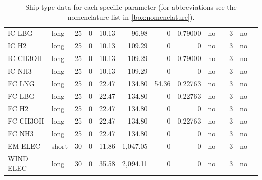 \documentclass[article]{elsarticle}
\begin{document}
\begin{table}[htb]
{\begin{tabular}{llrrrrrrrrrrr}
        IC LBG         & long  & 25     & 0      & 10.13       & 96.98    & 0                & 0.79000          & no    &                & 3           & no     & \cite{UNCTAD2017,Bengtsson2012} \\
        IC H2          & long  & 25     & 0      & 10.13       & 109.29   & 0                & 0                & no    &                & 3           & no     & \cite{UNCTAD2017,ElGohary2013} \\
        IC CH3OH       & long  & 25     & 0      & 10.13       & 109.29   & 0                & 0.79000          & no    &                & 3           & no     & \cite{UNCTAD2017,Andersson2015,BRYNOLF2014} \\
        IC NH3         & long  & 25     & 0      & 10.13       & 109.29   & 0                & 0                & no    &                & 3           & no     & \cite{UNCTAD2017} \\
        FC LNG         & long  & 25     & 0      & 22.47       & 134.80   & 54.36            & 0.22763          & no    &                & 3           & no     & \cite{UNCTAD2017,VanBiert2016} \\
        FC LBG         & long  & 25     & 0      & 22.47       & 134.80   & 0                & 0.22763          & no    &                & 3           & no     & \cite{UNCTAD2017,VanBiert2016} \\
        FC H2          & long  & 25     & 0      & 22.47       & 134.80   & 0                & 0                & no    &                & 3           & no     & \cite{UNCTAD2017,USDE2015} \\
        FC CH3OH       & long  & 25     & 0      & 22.47       & 134.80   & 0                & 0.22763          & no    &                & 3           & no     & \cite{UNCTAD2017,VanBiert2016} \\
        FC NH3         & long  & 25     & 0      & 22.47       & 134.80   & 0                & 0                & no    &                & 3           & no     & \cite{UNCTAD2017} \\
        EM ELEC        & short & 30     & 0      & 11.86       & 1,047.05 & 0                & 0                & no    &                & 3           & no     & \cite{DNVGL2015} \\
        WIND ELEC      & long  & 30     & 0      & 35.58       & 2,094.11 & 0                & 0                & no    &                & 3           & no     &  \\  
    \bottomrule
    \end{tabular}}
    \caption[Ship type data]{Ship type data for each specific parameter (for abbreviations see the nomenclature list in \cref{box:nomenclature}).}
    \label{tab:ship_data}
\end{table}
\end{document}
